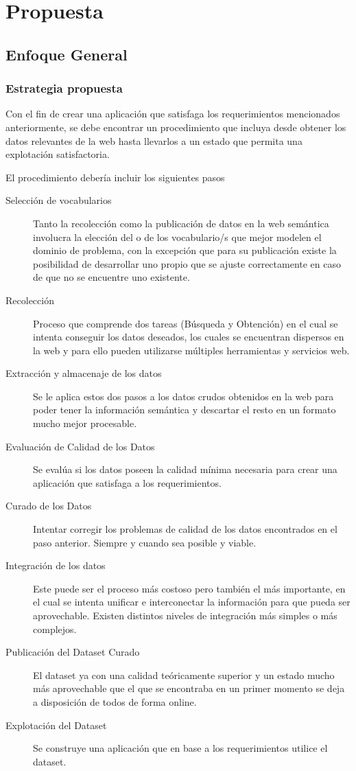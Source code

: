 \part{Propuesta}

\chapter{Enfoque General}
\label{chapter:estrategia}

\section{Estrategia propuesta}
Con el fin de crear una aplicación que satisfaga los requerimientos mencionados anteriormente, se debe encontrar
un procedimiento que incluya desde obtener los datos relevantes de la web hasta llevarlos a un estado que permita una 
explotación satisfactoria. 

El procedimiento debería incluir los siguientes pasos  

\begin{description}
\item[Selección de vocabularios ] Tanto la recolección como la publicación de datos en la web semántica involucra la elección del o de los vocabulario/s que mejor modelen el dominio de problema, con la excepción que para su publicación existe la posibilidad de desarrollar uno propio que se ajuste correctamente en caso de que no se encuentre uno existente. 
\item[Recolección  ] Proceso que comprende dos tareas (Búsqueda y Obtención) en el cual se intenta conseguir los datos deseados, los cuales se encuentran dispersos en la web y para ello pueden utilizarse múltiples herramientas y servicios web.
\item[Extracción y almacenaje de los datos] Se le aplica estos dos pasos a los datos crudos obtenidos en la web para poder tener la información semántica y descartar el resto en un formato mucho mejor procesable.
\item[Evaluación de Calidad de los Datos] Se evalúa si los datos poseen la calidad mínima necesaria para crear una aplicación que satisfaga a los requerimientos.
\item[Curado de los Datos] Intentar corregir los problemas de calidad de los datos encontrados en el paso anterior. Siempre y cuando sea posible y viable.
\item[Integración de los datos] Este puede ser el proceso más costoso pero también el más importante, en el cual se intenta unificar e interconectar la información para que pueda ser aprovechable. Existen distintos niveles de integración más simples o más complejos.
\item[Publicación del Dataset Curado] El dataset ya con una calidad teóricamente superior y un estado mucho más aprovechable que el que se encontraba en un primer momento se deja a disposición de todos de forma online.  
\item[Explotación del Dataset] Se construye una aplicación que en base a los requerimientos utilice el dataset. 
\end{description}

